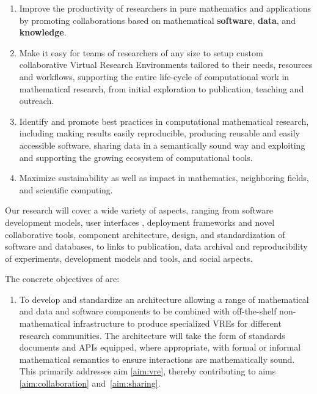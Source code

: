 \documentclass[noworkareas,deliverables,keys]{euproposal}                  %
\begin{document}
\begin{proposal}
\begin{enumerate}
\item \label{aim:collaboration} Improve the productivity of
  researchers in pure mathematics and applications by promoting
  collaborations based on mathematical \textbf{software},
  \textbf{data}, and \textbf{knowledge}.
\item \label{aim:vre} Make it easy for teams of
  researchers of any size to setup custom collaborative Virtual Research
  Environments tailored to their needs, resources and workflows, supporting the
  entire life-cycle of computational work in mathematical research,
  from initial exploration to publication, teaching and outreach.
\item \label{aim:sharing} Identify and promote best practices in
  computational mathematical research, including making results easily
  reproducible, producing reusable and easily accessible
  software, sharing data in a semantically sound way and exploiting and
  supporting the growing ecosystem of computational tools.
\item \label{aim:impact} Maximize sustainability as well as impact in
  mathematics, neighboring fields, and scientific computing.

\end{enumerate}



Our research will cover a wide variety of aspects, ranging from
software development models, user interfaces , deployment frameworks and novel collaborative tools,
component architecture, design, and standardization of software
 and databases, to links to publication, data archival
and reproducibility of experiments, development models and tools, and
social aspects.


The concrete objectives of \TheProject are:
\begin{enumerate}
\item\label{objective:framework} To develop and standardize
  an architecture allowing a range of mathematical and
  data and software components to be combined 
  with off-the-shelf non-mathematical infrastructure to produce
  specialized VREs for different research communities. The
  architecture will take the form of standards documents and APIs
  equipped, where appropriate, with formal or informal mathematical
  semantics to ensure interactions are mathematically sound. This primarily
  addresses aim \ref{aim:vre}, thereby contributing to aims
  \ref{aim:collaboration} and~\ref{aim:sharing}. 


\end{enumerate}
\end{proposal}
\end{document}
